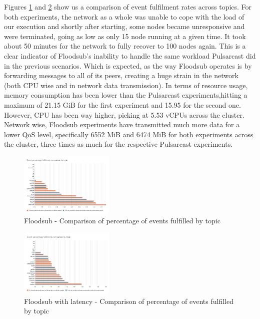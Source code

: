 Figures \ref{fig:graph-floodsub-event-percentage-fulfillment-comparison} and
\ref{fig:graph-floodsub-latency-event-percentage-fulfillment-comparison} show
us a comparison of event fulfilment rates across topics. For both experiments,
the network as a whole was unable to cope with the load of our execution and
shortly after starting, some nodes became unresponsive and were terminated,
going as low as only 15 node running at a given time. It took about 50 minutes
for the network to fully recover to 100 nodes again. This is a clear indicator
of Floodsub's inability to handle the same workload Pulsarcast did in the
previous scenarios. Which is expected, as the way Floodsub operates is by
forwarding messages to all of its peers, creating a huge strain in the network
(both CPU wise and in network data transmission). In terms of resource usage,
memory consumption has been lower than the Pulsarcast experiments,hitting a
maximum of 21.15 GiB for the first experiment and 15.95 for the second one.
However, CPU has been way higher, picking at 5.53 vCPUs across the cluster.
Network wise, Floodsub experiments have transmitted much more data for a lower
QoS level, specifically 6552 MiB and 6474 MiB for both experiments across the
cluster, three times as much for the respective Pulsarcast experiments.

\begin{figure}[!htb]
  \centering
  \includegraphics[width=0.4\textwidth]{img/graph-floodsub-event-percentage-fulfillment-comparison.png}
  \caption{Floodsub - Comparison of percentage of events fulfilled by topic}
  \label{fig:graph-floodsub-event-percentage-fulfillment-comparison}
\end{figure}

\begin{figure}[!htb]
  \centering
  \includegraphics[width=0.4\textwidth]{img/graph-floodsub-latency-event-percentage-fulfillment-comparison.png}
  \caption{Floodsub with latency - Comparison of percentage of events fulfilled by topic}
  \label{fig:graph-floodsub-latency-event-percentage-fulfillment-comparison}
\end{figure}


